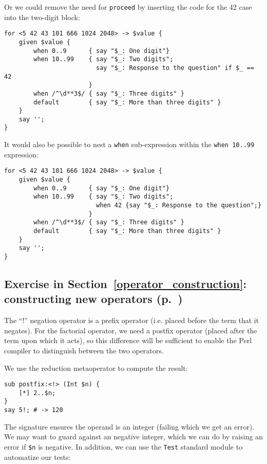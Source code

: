 {Or we could remove the need for {\tt proceed} by inserting 
the code for the 42 case into the two-digit block: 

\begin{verbatim}
for <5 42 43 101 666 1024 2048> -> $value {
    given $value {
        when 0..9      { say "$_: One digit"}
        when 10..99    { say "$_: Two digits"; 
                         say "$_: Response to the question" if $_ == 42
                       }
        when /^\d**3$/ { say "$_: Three digits" }
        default        { say "$_: More than three digits" }
    }
    say '';
}
\end{verbatim}

It would also be possible to nest a \verb'when' sub-expression 
within the \verb'when 10..99' expression:

\begin{verbatim}
for <5 42 43 101 666 1024 2048> -> $value {
    given $value {
        when 0..9      { say "$_: One digit"}
        when 10..99    { say "$_: Two digits"; 
                         when 42 {say "$_: Response to the question";}
                       }
        when /^\d**3$/ { say "$_: Three digits" }
        default        { say "$_: More than three digits" }
    }
    say '';
}
\end{verbatim}

\subsection{Exercise in Section~\ref{operator_construction}: constructing new operators (p.~\pageref{fact_operator})}
\label{sol_fact_operator}

The ``!'' negation operator is a prefix operator (i.e. placed 
before the term that it negates). For the factorial operator, 
we need a postfix operator (placed after the term upon which it 
acts), so this difference will be sufficient to enable the 
Perl compiler to distinguish between the two operators.

We use the reduction metaoperator to compute the result:

\begin{verbatim}
sub postfix:<!> (Int $n) {
    [*] 2..$n;
}
say 5!; # -> 120
\end{verbatim}

The signature ensures the operand is an integer (failing which 
we get an error). We may want to guard against an 
negative integer, which we can do by raising an error if 
\verb'$n' is negative. In addition, we can use the {\tt Test} 
standard module to automatize our tests:

}
